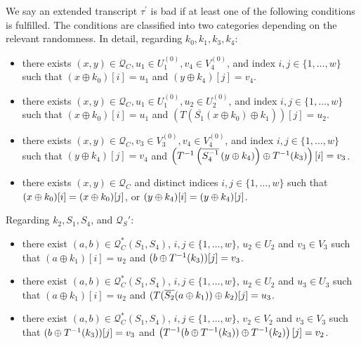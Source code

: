 \begin{definition}
\label{defn:bad-tau-4-rounds}

We say an extended transcript $\tau^{\prime}$ is bad if at least one of the following conditions is fulfilled. The conditions are classified into two categories depending on the relevant randomness. In detail, regarding $k_0,k_1,k_3,k_4$:
\begin{itemize}[leftmargin=10mm]
	\item[\bone]
	there exists $(x, y) \in \mathcal{Q}_{C}, u_1 \in U_1^{(0)}, v_4 \in V_4^{(0)}$, and index $i, j \in \{1, \ldots, w\}$ such that $\left(x \oplus k_{0}\right)[i]=u_1$ and $\left(y \oplus k_{4}\right)[j]=v_4$.
	\item[\btwo]
	there exists $(x,y) \in \mathcal{Q}_{C}, u_1 \in U_1^{(0)}, u_2\in U_2^{(0)}$, and index $i, j \in \{1, \ldots, w\}$ such that $\left(x \oplus k_{0}\right)[i]=u_1$ and $\left(T\left(\overline{S_1}\left(x \oplus k_{0}\right) \oplus k_{1}\right)\right)[j]=u_2$.
	\item[\bthree]
	there exists $(x,y) \in \mathcal{Q}_{C}, v_{3}\in V_3^{(0)}, v_{4}\in V_4^{(0)}$, and index $i, j \in \{1, \ldots, w\}$ such that $\left(y \oplus k_{4}\right)[j]=v_4$ and $\left(T^{-1}\left(\overline{S_4^{-1}}\left(y \oplus k_{4}\right)\right)\oplus T^{-1}(k_3)\right) [i]=v_3$.
	\item[\bfour]
	there exists $(x,y) \in \mathcal{Q}_{C}$ and distinct indices $i, j \in \{1, \ldots, w\}$ such that $(x\oplus k_0)[i]=(x\oplus k_0)[j]$, or $(y\oplus k_4)[i]=(y\oplus k_4)[j]$.
\end{itemize}
%
%
Regarding $k_2,S_1,S_4$, and $\mathcal{Q}_S'$:
%
%
\begin{itemize}[leftmargin=10mm]
	\item[\cone]
	there exist $(a, b) \in \mathcal{Q}_{C}^{*}\left(S_{1}, S_{4}\right)$, $i, j \in\{1, \ldots, w\}$, $u_{2} \in U_{2}$ and $v_{3} \in V_{3}$ such that $(a \oplus k_1)[i] = u_2$ and $(b\oplus T^{-1}(k_3))[j] = v_3$.
	\item[\ctwo]
	there exist $(a, b) \in \mathcal{Q}_{C}^{*}\left(S_{1}, S_{4}\right)$, $i, j \in\{1, \ldots, w\}$, $u_{2} \in U_{2}$ and $u_{3} \in U_{3}$ such that $(a \oplus k_1)[i] = u_2$ and $(T(\overline{S_2}(a \oplus k_1))\oplus k_2)[j] = u_3$.
	\item[\cthree]
	there exist $(a, b) \in \mathcal{Q}_{C}^{*}\left(S_{1}, S_{4}\right)$, $i, j \in\{1, \ldots, w\}$, $v_{2} \in V_{2}$ and $v_{3} \in V_{3}$ such that $(b\oplus T^{-1}(k_3))[j] = v_3$ and $\left(T^{-1}(b\oplus T^{-1}(k_3)) \oplus T^{-1}(k_2)\right)[j] = v_2$.

\end{itemize}
\end{definition}
